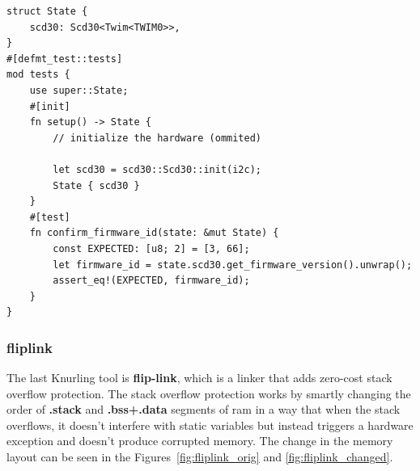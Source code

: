 \newpage
\begin{lstlisting}[caption={Integration test written using defmt\textendash test.},label=lst:defmttest]
struct State {
    scd30: Scd30<Twim<TWIM0>>,
}
#[defmt_test::tests]
mod tests {
    use super::State;
    #[init]
    fn setup() -> State {
        // initialize the hardware (ommited)

        let scd30 = scd30::Scd30::init(i2c);
        State { scd30 }
    }
    #[test]
    fn confirm_firmware_id(state: &mut State) {
        const EXPECTED: [u8; 2] = [3, 66];
        let firmware_id = state.scd30.get_firmware_version().unwrap();
        assert_eq!(EXPECTED, firmware_id);
    }
}
\end{lstlisting}

\subsubsection{flip\textendash link}
The last Knurling tool is \textbf{flip-link}, which is a linker that adds zero-cost stack overflow protection\cite{knurling_project_knurling-rsflip-link_2021}.
The stack overflow protection works by smartly changing the order of \textbf{.stack} and \textbf{.bss+.data} segments of \acs{ram} in a way that when the stack overflows, it doesn't interfere with static variables but instead triggers a hardware exception and doesn't produce corrupted memory.
The change in the memory layout can be seen in the Figures~\ref{fig:fliplink_orig} and \ref{fig:fliplink_changed}.
